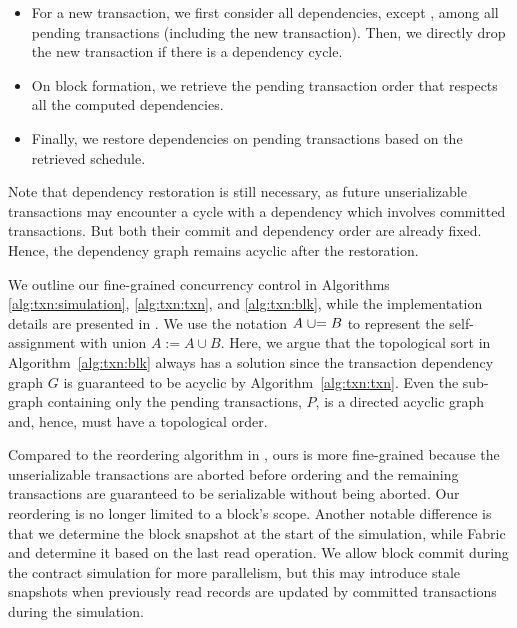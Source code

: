 {\begin{itemize}

\item For a new transaction, we first consider all dependencies, except
  , among all pending transactions (including the new
  transaction).
  Then, we directly drop the new transaction if there is a dependency cycle.

\item On block formation, we retrieve the pending transaction order that
  respects all the computed dependencies.

\item Finally, we restore  dependencies on pending transactions
  based on the retrieved schedule.

\end{itemize}

Note that  dependency restoration is still necessary, 
%
as future unserializable transactions may encounter a cycle with a 
dependency which involves committed transactions. 
%
But both their commit and dependency order are already fixed.
%
Hence, the dependency graph remains acyclic after the restoration.

We outline our fine-grained concurrency control in Algorithms \ref{alg:txn:simulation}, \ref{alg:txn:txn}, and \ref{alg:txn:blk}, while the implementation details are presented in .
%
We use the notation $A \mathrel{{\cup}{=}} B$ to represent the self-assignment with union $A := A \cup B$.
%
Here, we argue that the topological sort in Algorithm~\ref{alg:txn:blk} always has a solution
since the transaction dependency graph $G$ is guaranteed to be acyclic by Algorithm~\ref{alg:txn:txn}.
%
Even the sub-graph containing only the pending transactions, $P$, is a directed
acyclic graph and, hence, must have a topological order.

Compared to the reordering algorithm in {\fabricPlusplus}, ours is more fine-grained
because the unserializable transactions are aborted before ordering and the
remaining transactions are guaranteed to be serializable without being aborted.
%
Our reordering is no longer limited to a block's scope.
Another notable difference is that we determine the block snapshot at the start
of the simulation, while Fabric and {\fabricPlusplus} determine it based on the last read
operation.
%
We allow block commit during the contract simulation for more
parallelism, but this may introduce stale snapshots when previously read records
are updated by committed transactions during the simulation.

}
